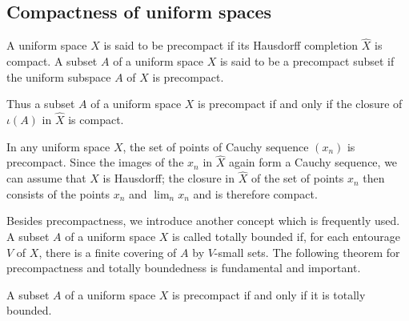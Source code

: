 \subsection{Compactness of uniform spaces}
\begin{definition}
A uniform space $X$ is said to be precompact if its Hausdorff completion $\widehat{X}$ is compact. A subset $A$ of a uniform space $X$ is said to be a precompact subset if the uniform subspace $A$ of $X$ is precompact.
\end{definition}
Thus a subset $A$ of a uniform space $X$ is precompact if and only if the
closure of $\iota(A)$ in $\widehat{X}$ is compact.
\begin{example}
In any uniform space $X$, the set of points of Cauchy sequence $(x_n)$ is precompact. Since the images of the $x_n$ in $\widehat{X}$ again form a  Cauchy sequence, we can assume that $X$ is Hausdorff; the closure in $\widehat{X}$ of the set of points $x_n$ then consists of the points $x_n$ and $\lim_nx_n$ and is therefore compact.
\end{example}
Besides precompactness, we introduce another concept which is frequently used. A subset $A$ of a uniform space $X$ is called totally bounded if, for each entourage $V$ of $X$, there is a finite covering of $A$ by $V$-small sets. The following theorem for precompactness and totally boundedness is fundamental and important.
\begin{theorem}\label{uniform space precompact iff totally bounded}
A subset $A$ of a uniform space $X$ is precompact if and only if it is totally bounded.
\end{theorem}
